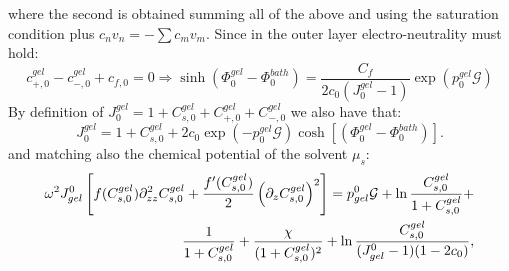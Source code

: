 \documentclass[12pt]{extarticle}
\begin{document}
where the second is obtained summing all of the above and using the saturation condition plus $c_nv_n=-\sum c_mv_m$. 
Since in the outer layer electro-neutrality must hold:
\begin{equation}
c^{gel}_{+,0}-c^{gel}_{-,0}+c_{f,0} =0 \Rightarrow  \sinh(\Phi_0^{gel}-\Phi_0^{bath})= \frac{C_f}{2c_0 (J_0^{gel}-1)}\exp(p_0^{gel}\mathcal{G})\label{eq2}
\end{equation}
By definition of $J^{gel}_0=1+C^{gel}_{s,0}+C^{gel}_{+,0}+C^{gel}_{-,0}$ we also have that:
\begin{equation}
J^{gel}_0=1+C^{gel}_{s,0}+ 2c_0\exp(-p_0^{gel}\mathcal{G})\cosh[(\Phi^{gel}_0-\Phi_0^{bath})]\label{eq3}.
\end{equation}
and matching also the chemical potential of the solvent $\mu_s$:
\begin{equation}
\begin{aligned}
\omega^2 J^0_{gel} \left[f(C^{gel}_{s,0})\partial_{zz}^2 C^{gel}_{s,0}+\frac{f'(C^{gel}_{s,0})}{2}\left(\partial_z C^{gel}_{s,0}\right)^2\right]= p^0_{gel} \mathcal{G}  + \ln \frac{C^{gel}_{s,0}}{1+C^{gel}_{s,0}} +\\ \frac{1}{1+C^{gel}_{s,0}}+\frac{\chi}{(1+C^{gel}_{s,0})^2} + \ln \frac{C^{gel}_{s,0}}{(J^0_{gel}-1)(1-2c_0)}, 
\end{aligned}\\[2.5mm]\label{eq4}
\end{equation}
\end{document}

